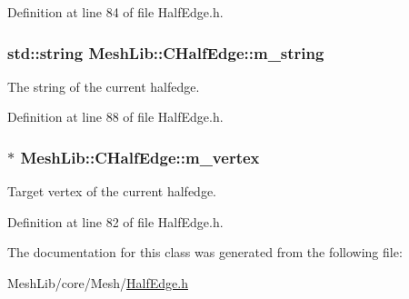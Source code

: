 Definition at line 84 of file Half\+Edge.\+h.

\subsubsection[{\texorpdfstring{m\+\_\+string}{m_string}}]{\setlength{\rightskip}{0pt plus 5cm}std\+::string Mesh\+Lib\+::\+C\+Half\+Edge\+::m\+\_\+string\hspace{0.3cm}{\ttfamily [protected]}}\hypertarget{class_mesh_lib_1_1_c_half_edge_a1b8813067a597ad547dc8e2a9405f653}{}\label{class_mesh_lib_1_1_c_half_edge_a1b8813067a597ad547dc8e2a9405f653}
The string of the current halfedge. 

Definition at line 88 of file Half\+Edge.\+h.

\subsubsection[{\texorpdfstring{m\+\_\+vertex}{m_vertex}}]{$\ast$ Mesh\+Lib\+::\+C\+Half\+Edge\+::m\+\_\+vertex\hspace{0.3cm}{\ttfamily [protected]}}\hypertarget{class_mesh_lib_1_1_c_half_edge_acaa06714b73d14153124be09a64236c0}{}\label{class_mesh_lib_1_1_c_half_edge_acaa06714b73d14153124be09a64236c0}
Target vertex of the current halfedge. 

Definition at line 82 of file Half\+Edge.\+h.



The documentation for this class was generated from the following file\+:\begin{DoxyCompactItemize}
\item 
Mesh\+Lib/core/\+Mesh/\hyperlink{_half_edge_8h}{Half\+Edge.\+h}\end{DoxyCompactItemize}

